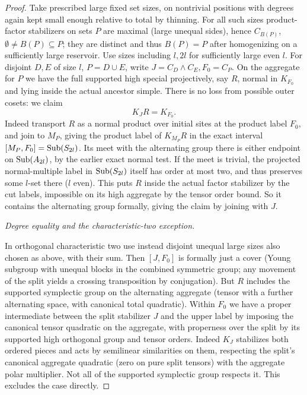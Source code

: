 \begin{proof}
Take prescribed large fixed set sizes, on nontrivial positions with degrees again kept small enough relative to total by thinning. For all such sizes product-factor stabilizers on sets \(P\) are maximal (large unequal sides), hence \(C_{B(P)}\), \(\emptyset\ne B(P)\subseteq P\); they are distinct and thus \(B(P)=P\) after homogenizing on a sufficiently large reservoir. Use sizes including \(l,2l\) for sufficiently large even \(l\). For disjoint \(D,E\) of size \(l\), \(P=D\cup E\), write \(J=C_D\wedge C_E, F_0=C_P\). On the aggregate for \(P\) we have the full supported high special projectively, say \(R\), normal in \(K_{F_0}\) and lying inside the actual ancestor simple. There is no loss from possible outer cosets: we claim
\[
                  K_J R=K_{F_0}.
\]
Indeed transport \(R\) as a normal product over initial sites at the product label \(F_0\), and join to \(M_P\), giving the product label of \(K_{M_P}R\) in the exact interval \([M_P,F_0]={\rm Sub}(S_{2l})\). Its meet with the alternating group there is either endpoint on \({\rm Sub}(A_{2l})\), by the earlier exact normal test. If the meet is trivial, the projected normal-multiple label in \({\rm Sub}(S_{2l})\) itself has order at most two, and thus preserves some \(l\)-set there (\(l\) even). This puts \(R\) inside the actual factor stabilizer by the cut labels, impossible on its high aggregate by the tensor order bound. So it contains the alternating group formally, giving the claim by joining with \(J\).

\noindent\emph{Degree equality and the characteristic-two exception.}

In orthogonal characteristic two use instead disjoint unequal large
sizes also chosen as above, with their sum.  Then \([J,F_0]\) is
formally just a cover (Young subgroup with unequal blocks in the
combined symmetric group; any movement of the split yields a crossing
transposition by conjugation).  But \(R\) includes the supported
symplectic group on the alternating aggregate (tensor with a further
alternating space, with canonical total quadratic).  Within \(F_0\)
we have a proper intermediate between the split stabilizer \(J\) and
the upper label by imposing the canonical tensor quadratic on the
aggregate, with properness over the split by its supported high
orthogonal group and tensor orders.  Indeed \(K_J\) stabilizes both
ordered pieces and acts by semilinear similarities on them, respecting
the split's canonical aggregate quadratic (zero on pure split tensors)
with the aggregate polar multiplier.  Not all of the supported
symplectic group respects it.  This excludes the case directly.


\end{proof}
